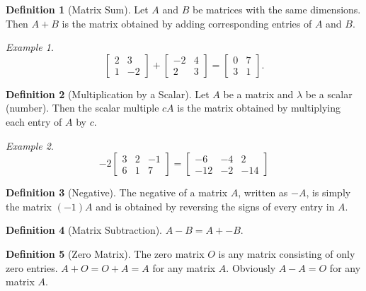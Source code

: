 \documentclass[10pt, a4paper]{amsart}
\theoremstyle{definition}
\newtheorem{defn}{Definition}
\theoremstyle{remark}
\newtheorem{ex}{Example}
\begin{document}
\begin{defn}[Matrix Sum]
  Let $ A $ and $ B $ be matrices with the same dimensions. Then $ A + B $ is
  the matrix obtained by adding corresponding entries of $ A $ and $ B $.
\end{defn}

\begin{ex}
  \begin{displaymath}
      \begin{bmatrix} 2 & 3 \\ 1 & -2 \end{bmatrix} + \begin{bmatrix} -2 & 4 \\ 2 & 3 \end{bmatrix}
    = \begin{bmatrix} 0 & 7 \\ 3 & 1 \end{bmatrix}.
  \end{displaymath}
\end{ex}

\begin{defn}[Multiplication by a Scalar]
  Let $ A $ be a matrix and $ \lambda $ be a scalar (number). Then the
  scalar multiple $ cA $ is the matrix obtained by multiplying each
  entry of $ A $ by $ c $.
\end{defn}

\begin{ex}
  \begin{displaymath}
    -2\begin{bmatrix} 3 & 2 & -1 \\ 6 & 1 & 7 \end{bmatrix} = \begin{bmatrix} -6 & -4 & 2 \\ -12 & -2 & -14 \end{bmatrix}
  \end{displaymath}
\end{ex}

\begin{defn}[Negative]
  The negative of a matrix $ A $, written as $ -A $, is simply the matrix $ (-1)A $
  and is obtained by reversing the signs of every entry in $ A $.
\end{defn}

\begin{defn}[Matrix Subtraction]
  $ A - B = A + -B $.
\end{defn}

\begin{defn}[Zero Matrix]
  The zero matrix $ O $ is any matrix consisting of only zero entries. $ A + O = O + A = A $ for
  any matrix $ A $. Obviously $ A - A = O $ for any matrix $ A $.
\end{defn}
\end{document}

